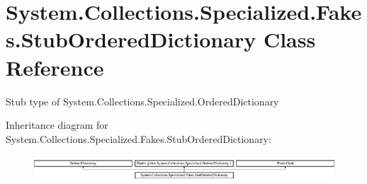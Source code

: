 \hypertarget{class_system_1_1_collections_1_1_specialized_1_1_fakes_1_1_stub_ordered_dictionary}{\section{System.\-Collections.\-Specialized.\-Fakes.\-Stub\-Ordered\-Dictionary Class Reference}
\label{class_system_1_1_collections_1_1_specialized_1_1_fakes_1_1_stub_ordered_dictionary}
}


Stub type of System.\-Collections.\-Specialized.\-Ordered\-Dictionary 


Inheritance diagram for System.\-Collections.\-Specialized.\-Fakes.\-Stub\-Ordered\-Dictionary\-:\begin{figure}[H]
\begin{center}
\leavevmode
\includegraphics[height=0.945148cm]{class_system_1_1_collections_1_1_specialized_1_1_fakes_1_1_stub_ordered_dictionary}
\end{center}
\end{figure}
